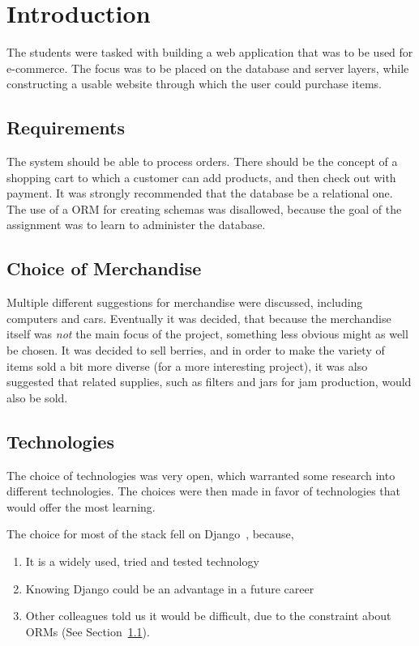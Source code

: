 \section{Introduction}\label{sec:introduction}

The students were tasked with building a web application that was to be
used for e-commerce. The focus was to be placed on the database and server
layers, while constructing a usable website through which the user could
purchase items.

\subsection{Requirements}\label{sec:requirements}

The system should be able to process orders. There should be the concept
of a shopping cart to which a customer can add products, and then check out
with payment. It was strongly recommended that the database be a relational
one. The use of a ORM for creating schemas was disallowed, because the goal
of the assignment was to learn to administer the database.

\subsection{Choice of Merchandise}\label{sec:merchandize}

Multiple different suggestions for merchandise were discussed, including
computers and cars. Eventually it was decided, that because the merchandise
itself was \emph{not} the main focus of the project, something less obvious
might as well be chosen. It was decided to sell berries, and in order to
make the variety of items sold a bit more diverse (for a more interesting
project), it was also suggested that related supplies, such as filters and
jars for jam production, would also be sold.

\subsection{Technologies}\label{sec:technologies}

The choice of technologies was very open, which warranted some research into
different technologies. The choices were then made in favor of technologies
that would offer the most learning.

The choice for most of the stack fell on Django~\cite{django}, because,

\begin{enumerate}
  \item It is a widely used, tried and tested technology
  \item Knowing Django could be an advantage in a future career
  \item Other colleagues told us it would be difficult, due to the constraint
    about ORMs (See Section~\ref{sec:requirements}).
\end{enumerate}

